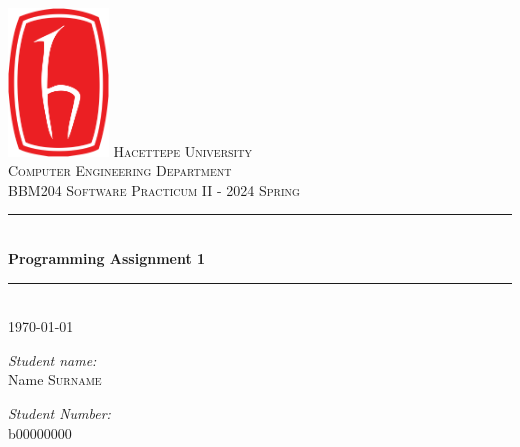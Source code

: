 \documentclass[11pt]{article}
\begin{document}
%


\begin{titlepage}
\newcommand{\HRule}{\rule{\linewidth}{0.5mm}}

\center

\includegraphics[width=0.2\textwidth]{logo.png}
\vfill
\textsc{\LARGE Hacettepe University}\\[0.5cm]
\textsc{\Large Computer Engineering Department}\\[1.5cm]
\textsc{\large BBM204 Software Practicum II - 2024 Spring}\\[0.5cm]

\HRule \\[0.4cm]
{ \huge \bfseries Programming Assignment 1}\\[0.4cm] 
\HRule \\[0.3cm]
{\large \today}\\[2cm]
\begin{minipage}{0.4\textwidth}
\begin{flushleft} \large
\emph{Student name:}\\
Name \textsc{Surname}
\end{flushleft}
\end{minipage}
\begin{minipage}{0.4\textwidth}
\begin{flushright} \large
\emph{Student Number:} \\
b00000000
\end{flushright}
\end{minipage}\\[2cm]
\vfill
\end{titlepage}
\end{document}
